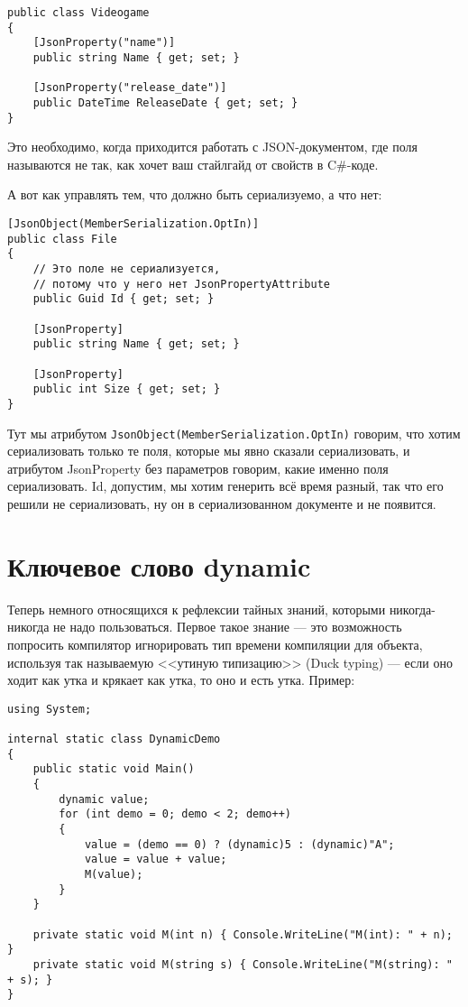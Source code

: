 \documentclass{../../text-style}
\begin{document}
\begin{verbatim}
public class Videogame
{
    [JsonProperty("name")]
    public string Name { get; set; }

    [JsonProperty("release_date")]
    public DateTime ReleaseDate { get; set; }
}
\end{verbatim}

Это необходимо, когда приходится работать с JSON-документом, где поля называются не так, как хочет ваш стайлгайд от свойств в C\#-коде.

А вот как управлять тем, что должно быть сериализуемо, а что нет:

\begin{verbatim}
[JsonObject(MemberSerialization.OptIn)]
public class File
{
    // Это поле не сериализуется,
    // потому что у него нет JsonPropertyAttribute
    public Guid Id { get; set; }

    [JsonProperty]
    public string Name { get; set; }

    [JsonProperty]
    public int Size { get; set; }
}
\end{verbatim}

Тут мы атрибутом \texttt{JsonObject(MemberSerialization.OptIn)} говорим, что хотим сериализовать только те поля, которые мы явно сказали сериализовать, и атрибутом JsonProperty без параметров говорим, какие именно поля сериализовать. Id, допустим, мы хотим генерить всё время разный, так что его решили не сериализовать, ну он в сериализованном документе и не появится.

\section{Ключевое слово dynamic}

Теперь немного относящихся к рефлексии тайных знаний, которыми никогда-никогда не надо пользоваться. Первое такое знание --- это возможность попросить компилятор игнорировать тип времени компиляции для объекта, используя так называемую <<утиную типизацию>> (Duck typing) --- если оно ходит как утка и крякает как утка, то оно и есть утка. Пример:

\begin{verbatim}
using System;

internal static class DynamicDemo
{
    public static void Main()
    {
        dynamic value;
        for (int demo = 0; demo < 2; demo++)
        {
            value = (demo == 0) ? (dynamic)5 : (dynamic)"A";
            value = value + value;
            M(value);
        }
    }

    private static void M(int n) { Console.WriteLine("M(int): " + n); }
    private static void M(string s) { Console.WriteLine("M(string): " + s); }
}
\end{verbatim}
\end{document}
